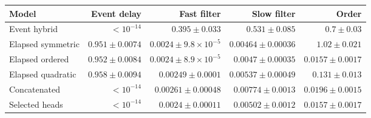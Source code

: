 \begin{tabular}{lrrrr}\toprule
Model & Event delay & Fast filter & Slow filter & Order \\\midrule
Event hybrid & $<10^{-14}$ & $0.395 \pm 0.033$ & $0.531 \pm 0.085$ & $0.7 \pm 0.03$ \\
Elapsed symmetric & $0.951 \pm 0.0074$ & $0.0024 \pm 9.8\times10^{-5}$ & $0.00464 \pm 0.00036$ & $1.02 \pm 0.021$ \\
Elapsed ordered & $0.952 \pm 0.0084$ & $0.0024 \pm 8.9\times10^{-5}$ & $0.0047 \pm 0.00035$ & $0.0157 \pm 0.0017$ \\
Elapsed quadratic & $0.958 \pm 0.0094$ & $0.00249 \pm 0.0001$ & $0.00537 \pm 0.00049$ & $0.131 \pm 0.013$ \\
Concatenated & $<10^{-14}$ & $0.00261 \pm 0.00048$ & $0.00774 \pm 0.0013$ & $0.0196 \pm 0.0015$ \\
Selected heads & $<10^{-14}$ & $0.0024 \pm 0.00011$ & $0.00502 \pm 0.0012$ & $0.0157 \pm 0.0017$ \\
\bottomrule\end{tabular}
